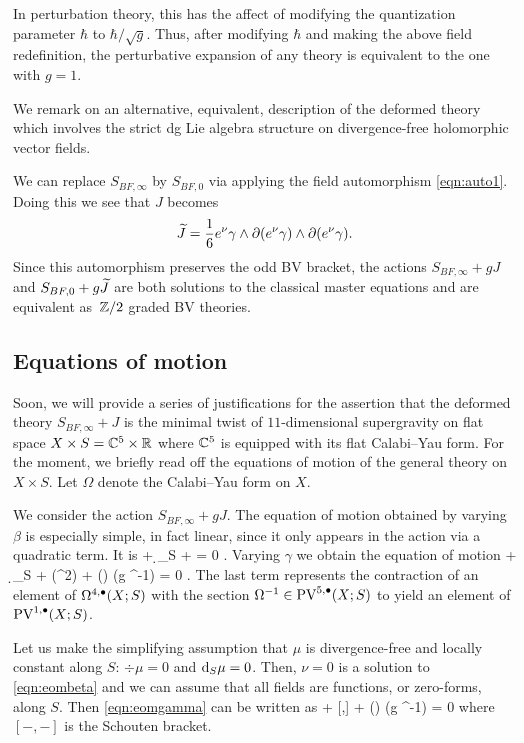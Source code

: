 In perturbation theory, this has the affect of modifying the quantization parameter $\hbar$ to $\hbar / \sqrt{g}$.
Thus, after modifying $\hbar$ and making the above field redefinition, the perturbative expansion of any theory is equivalent to the one with $g = 1$. 

\parsec[s:altdfn]

We remark on an alternative, equivalent, description of the deformed theory which involves the strict dg Lie algebra structure on divergence-free holomorphic vector fields.

We can replace $S_{BF,\infty}$ by $S_{BF,0}$ via applying the field automorphism \eqref{eqn:auto1}.
Doing this we see that $J$ becomes 
\[
\widetilde{J} = \frac16 e^\nu \gamma \wedge \partial (e^\nu \gamma) \wedge \partial(e^\nu \gamma) .
\]
Since this automorphism preserves the odd BV bracket, the actions $S_{BF,\infty} + g J$ and $S_{BF, 0} + g \widetilde{J}$ are both solutions to the classical master equations and are equivalent as~$\mathbb Z/2$ graded BV theories.

\subsection{Equations of motion} \label{s:eom}

Soon, we will provide a series of justifications for the assertion that the deformed theory $S_{BF, \infty} + J$ is the minimal twist of $11$-dimensional supergravity on flat space $X \times S = \mathbb C^5 \times \mathbb R$ where $\mathbb C^5$ is equipped with its flat Calabi--Yau form. 
For the moment, we briefly read off the equations of motion of the general theory on $X \times S$.
Let $\Omega$ denote the Calabi--Yau form on $X$. 

We consider the action $S_{BF, \infty} + gJ$.
The equation of motion obtained by varying $\beta$ is especially simple, in fact linear, since it only appears in the action via a quadratic term. 
It is
\beqn\label{eqn:eombeta}
\dbar \nu + \d_S \nu + \div \mu = 0 .
\eeqn
Varying $\gamma$ we obtain the equation of motion
\beqn\label{eqn:eomgamma}
\dbar \mu + \d_S \mu +   \div (\mu^2) +  (\del \gamma \wedge \del \gamma) \vee (g \Omega^{-1}) = 0 .
\eeqn
The last term represents the contraction of an element of $\Omega^{4,\bullet}(X;S)$ with the section $\Omega^{-1} \in {\rm PV}^{5,\bullet}(X;S)$ to yield an element of ${\rm PV}^{1,\bullet}(X;S)$. 

Let us make the simplifying assumption that $\mu$ is divergence-free and locally constant along $S$: $\div \mu = 0$ and ${\rm d}_S \mu = 0$.
Then, $\nu = 0$ is a solution to \eqref{eqn:eombeta} and we can assume that all fields are functions, or zero-forms, along $S$. 
Then \eqref{eqn:eomgamma} can be written as 
\beqn\label{eqn:eomgamma1}
\dbar \mu +  [\mu,\mu] +  (\del \gamma \wedge \del \gamma) \vee (g \Omega^{-1}) = 0 
\eeqn
where $[-,-]$ is the Schouten bracket. 

